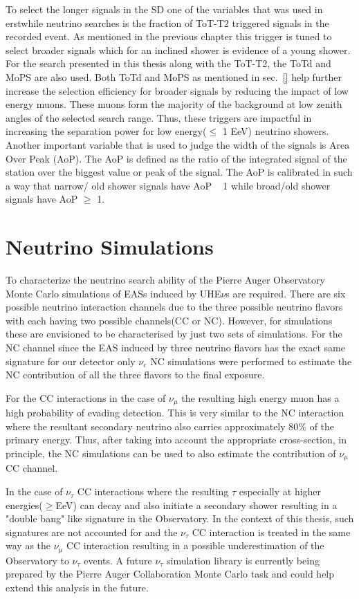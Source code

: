 To select the longer signals in the SD one of the variables that was used in erstwhile neutrino searches is the fraction of ToT-T2 triggered signals in the recorded event. As mentioned in the previous chapter this trigger is tuned to select broader signals which for an inclined shower is evidence of a young shower. For the search presented in this thesis along with the ToT-T2, the ToTd and MoPS are also used. Both ToTd and MoPS as mentioned in sec.~\ref{} help further increase the selection efficiency for broader signals by reducing the impact of low energy muons. These muons form the majority of the background at low zenith angles of the selected search range. Thus, these triggers are impactful in increasing the separation power for low energy($\leq$ 1 EeV) neutrino showers. Another important variable that is used to judge the width of the signals is Area Over Peak (AoP). The AoP is defined as the ratio of the integrated signal of the station over the biggest value or peak of the signal. The AoP is calibrated in such a way that narrow/ old shower signals have AoP ~ 1 while broad/old shower signals have AoP $\geqslant $ 1. 



\section{Neutrino Simulations}
\label{sec:sim_DGL}
To characterize the neutrino search ability of the Pierre Auger Observatory Monte Carlo simulations of EASs induced by UHE$\nu$s are required. There are six possible neutrino interaction channels due to the three possible neutrino flavors with each having two possible channels(CC or NC). However, for simulations these are envisioned to be characterised by just two sets of simulations. For the NC channel since the EAS induced by three neutrino flavors has the exact same signature for our detector only $\nu_e$ NC simulations were performed to estimate the NC contribution of all the three flavors to the final exposure. 

For the CC interactions in the case of $\nu_{\mu}$ the resulting high energy muon has a high probability of evading detection. This is very similar to the NC interaction where the resultant secondary neutrino also carries approximately 80\% of the primary energy. Thus, after taking into account the appropriate cross-section, in principle, the NC simulations can be used to also estimate the contribution of $\nu_{\mu}$ CC channel.  

In the case of $\nu_{\tau}$ CC interactions where the resulting $\tau$ especially at higher energies($\geq $EeV) can decay and also initiate a secondary shower resulting in a "double bang" like signature in the Observatory. In the context of this thesis, such signatures are not accounted for and the $\nu_{\tau}$ CC interaction is treated in the same way as the $\nu_{\mu}$ CC interaction resulting in a possible underestimation of the Observatory to $\nu_{\tau}$ events. A future $\nu_{\tau}$ simulation library is currently being prepared by the Pierre Auger Collaboration Monte Carlo task and could help extend this analysis in the future.

